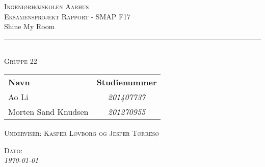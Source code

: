 \thispagestyle{empty}
\newcommand{\HRule}{\rule{\linewidth}{0.1mm}} %

\begin{center}
	\vspace{3cm}
	\textsc{\LARGE Ingeniørhøjskolen Aarhus}\\[1.5cm] %
	
	\textsc{\large Eksamensprojekt Rapport - SMAP F17}\\[2.5cm] 
	

	{\HUGE Shine My Room} \\[0.5cm]
	
	\HRule \\[0.8cm]
	
	
	\textsc{\large Gruppe 22}\\
	\vspace{0.5 in}
	\begin{center}
		\begin{tabular}{l c}
			\textbf{Navn} & \textbf{Studienummer} \\
			Ao Li & \textsl{201407737}    \\
			Morten Sand Knudsen & \textsl{201270955}  \\
			
		\end{tabular}
	\end{center}
	\vspace{0.5 in}
	
	\textsc{\large Underviser: Kasper Løvborg og Jesper Tørresø}
	\vspace{0.5 in}
	
	\textsc{\large Dato: }\\
	{\large\textit{\today}} \\[3cm]
	\vfill %
	
\end{center} %

\clearpage

\newpage
